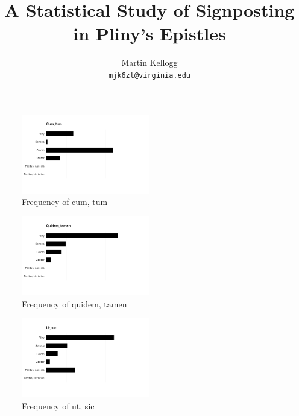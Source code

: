 \documentclass[11pt,twocolumn]{article}
\begin{document}
\title{A Statistical Study of Signposting in Pliny's Epistles}

\author{
  Martin Kellogg\\
  \texttt{mjk6zt@virginia.edu}
}

\maketitle






\newpage

\begin{figure}
\includegraphics[width=0.5\textwidth]{cumtum.png}
\caption{\label{fig:gs}\label{fig:ct}Frequency of cum, tum}
\end{figure}

\begin{figure}
\includegraphics[width=0.5\textwidth]{quidemtamen.png}
\caption{\label{fig:qt}Frequency of quidem, tamen}
\end{figure}

\begin{figure}
\includegraphics[width=0.5\textwidth]{utsic.png}
\caption{\label{fig:us}Frequency of ut, sic}
\end{figure}
\end{document}
